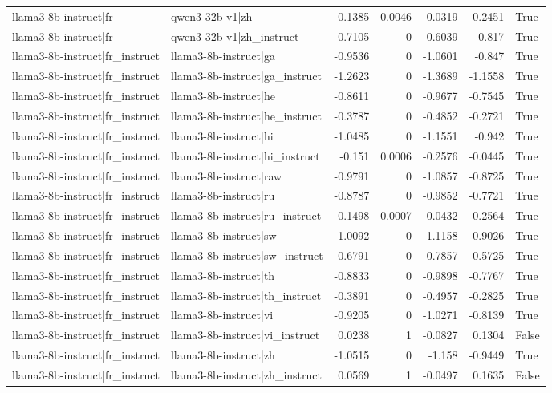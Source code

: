 \begin{table}
\begin{tabular}{l l r r r r l}
llama3-8b-instruct|fr & qwen3-32b-v1|zh & 0.1385 & 0.0046 & 0.0319 & 0.2451 & True \\
llama3-8b-instruct|fr & qwen3-32b-v1|zh_instruct & 0.7105 & 0 & 0.6039 & 0.817 & True \\
llama3-8b-instruct|fr_instruct & llama3-8b-instruct|ga & -0.9536 & 0 & -1.0601 & -0.847 & True \\
llama3-8b-instruct|fr_instruct & llama3-8b-instruct|ga_instruct & -1.2623 & 0 & -1.3689 & -1.1558 & True \\
llama3-8b-instruct|fr_instruct & llama3-8b-instruct|he & -0.8611 & 0 & -0.9677 & -0.7545 & True \\
llama3-8b-instruct|fr_instruct & llama3-8b-instruct|he_instruct & -0.3787 & 0 & -0.4852 & -0.2721 & True \\
llama3-8b-instruct|fr_instruct & llama3-8b-instruct|hi & -1.0485 & 0 & -1.1551 & -0.942 & True \\
llama3-8b-instruct|fr_instruct & llama3-8b-instruct|hi_instruct & -0.151 & 0.0006 & -0.2576 & -0.0445 & True \\
llama3-8b-instruct|fr_instruct & llama3-8b-instruct|raw & -0.9791 & 0 & -1.0857 & -0.8725 & True \\
llama3-8b-instruct|fr_instruct & llama3-8b-instruct|ru & -0.8787 & 0 & -0.9852 & -0.7721 & True \\
llama3-8b-instruct|fr_instruct & llama3-8b-instruct|ru_instruct & 0.1498 & 0.0007 & 0.0432 & 0.2564 & True \\
llama3-8b-instruct|fr_instruct & llama3-8b-instruct|sw & -1.0092 & 0 & -1.1158 & -0.9026 & True \\
llama3-8b-instruct|fr_instruct & llama3-8b-instruct|sw_instruct & -0.6791 & 0 & -0.7857 & -0.5725 & True \\
llama3-8b-instruct|fr_instruct & llama3-8b-instruct|th & -0.8833 & 0 & -0.9898 & -0.7767 & True \\
llama3-8b-instruct|fr_instruct & llama3-8b-instruct|th_instruct & -0.3891 & 0 & -0.4957 & -0.2825 & True \\
llama3-8b-instruct|fr_instruct & llama3-8b-instruct|vi & -0.9205 & 0 & -1.0271 & -0.8139 & True \\
llama3-8b-instruct|fr_instruct & llama3-8b-instruct|vi_instruct & 0.0238 & 1 & -0.0827 & 0.1304 & False \\
llama3-8b-instruct|fr_instruct & llama3-8b-instruct|zh & -1.0515 & 0 & -1.158 & -0.9449 & True \\
llama3-8b-instruct|fr_instruct & llama3-8b-instruct|zh_instruct & 0.0569 & 1 & -0.0497 & 0.1635 & False \\

\end{tabular}
\end{table}
